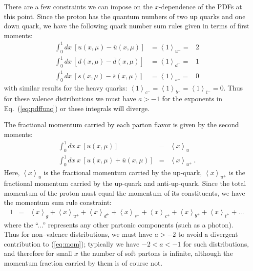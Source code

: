 There are a few constraints we
can impose on the $x$-dependence of the PDFs at this point. Since
the proton has the quantum numbers of two up quarks and one down quark,
we have the following quark number sum rules given in terms of first
moments: 
%
\begin{eqnarray}
\int_{0}^{1}dx\ \left[u(x,\mu)-\bar{u}(x,\mu)\right] & =\left\langle 1\right\rangle _{u^{-}}= & 2\\
\int_{0}^{1}dx\ \left[d(x,\mu)-\bar{d}(x,\mu)\right] & =\left\langle 1\right\rangle _{d^{-}}= & 1\\
\int_{0}^{1}dx\ \left[s(x,\mu)-\bar{s}(x,\mu)\right] & =\left\langle 1\right\rangle _{s^{-}}= & 0
\end{eqnarray}
with similar results for the heavy quarks: $\left\langle 1\right\rangle _{c^{-}}=\left\langle 1\right\rangle _{b^{-}}=\left\langle 1\right\rangle _{t^{-}}=0$. Thus for these valence distributions we must have $a>-1$ for the exponents in
Eq.~(\ref{eq:pdffunc}) or these integrals will diverge.

The fractional momentum carried
by each parton flavor is given by the second moments: 
%
\begin{eqnarray}
\int_{0}^{1}dx\ x\ \left[u(x,\mu)\right] & = & \left\langle x\right\rangle _{u}\\
\int_{0}^{1}dx\ x\ \left[u(x,\mu)+\bar{u}(x,\mu)\right] & = & \left\langle x\right\rangle _{u^{+}}\ .
\end{eqnarray}
%
Here, $\left\langle x\right\rangle _{u}$ is the fractional momentum
carried by the up-quark, $\left\langle x\right\rangle _{u^{+}}$ is
the fractional momentum carried by the up-quark and anti-up-quark.
Since the total momentum of the proton must equal the momentum of
its constituents, we have the momentum sum rule constraint: 
%
\begin{eqnarray}\label{eq:mom}
1 & = & \left\langle x\right\rangle _{g}+\left\langle x\right\rangle _{u^{+}}+\left\langle x\right\rangle _{d^{+}}+\left\langle x\right\rangle _{s^{+}}+\left\langle x\right\rangle _{c^{+}}+\left\langle x\right\rangle _{b^{+}}+\left\langle x\right\rangle _{t^{+}}+...
\end{eqnarray}
%
where the ``...'' represents any other partonic components (such
as a photon). Thus for non--valence distributions, we must have $a>-2$ to avoid a divergent contribution to (\ref{eq:mom}); typically we have $-2<a<-1$ for such distributions, and therefore for small $x$ the number of soft partons is infinite, although the momentum fraction carried by them is of course not.

